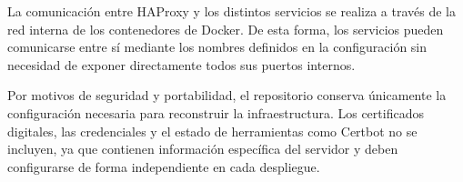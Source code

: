 La comunicación entre HAProxy y los distintos servicios se realiza a través de la red interna de los contenedores de Docker. De esta forma, los servicios pueden comunicarse entre sí mediante los nombres definidos en la configuración sin necesidad de exponer directamente todos sus puertos internos.

Por motivos de seguridad y portabilidad, el repositorio conserva únicamente la configuración necesaria para reconstruir la infraestructura. Los certificados digitales, las credenciales y el estado de herramientas como Certbot no se incluyen, ya que contienen información específica del servidor y deben configurarse de forma independiente en cada despliegue.
